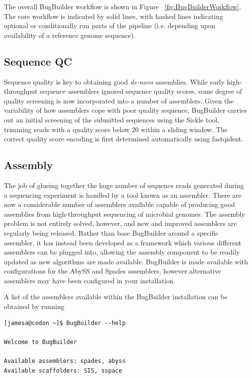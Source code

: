 \documentclass[a4paper,twoside,10pt]{article}
\begin{document}
The overall BugBuilder workflow is shown in Figure ~\ref{fig:BugBuilderWorkflow}. The core workflow
is indicated by solid lines, with hashed lines indicating optional or conditionally run parts of
the pipeline (i.e. depending upon availability of a reference genome sequence). 

\subsection{Sequence QC}

Sequence quality is key to obtaining good \textit{de-novo} assemblies. While early high-throughput
sequence assemblers ignored sequence quality scores, some degree of quality screening is now
incorporated into a number of assemblers. Given the variability of how assemblers cope with poor
quality sequence, BugBuilder carries out an initial screening of the submitted sequences using
the Sickle tool, trimming reads with a quality score below 20 within a sliding window. The correct
quality score encoding is first determined automatically using fastqident.

\subsection{Assembly}

The job of glueing together the huge number of sequence reads generated during a sequencing
experiment is handled by a tool known as an assembler. There are now a considerable number of
assemblers available capable of producing good assemblies from high-throughput sequencing of
microbial genomes. The assembly problem is not entirely solved, however, and new and improved
assemblers are regularly being released. Rather than base BugBuilder around a specific assembler,
it has instead been developed as a framework which various different assemblers can be plugged
into, allowing the assembly component to be readily updated as new algorithms are made available.
BugBuilder is made available with configurations for the AbySS and Spades assemblers, however
alternative assemblers may have been configured in your installation.

A list of the assemblers available within the BugBuilder installation can be obtained by running

\begin{verbatim}
[jamesa@codon ~]$ BugBuilder --help

Welcome to BugBuilder

Available assemblers: spades, abyss
Available scaffolders: SIS, sspace
\end{verbatim}
\end{document}
